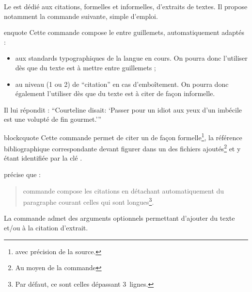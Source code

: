 \documentclass[english,nolocaltoc]{nwejmart}
\newtheorem[style=definition]{fait}
\newtheorem[title=expérience]{experience}
\newtheorem[title-plural=anneaux]{anneau}
\newtheorem[title=idéal,title-plural=idéaux]{ideal}
\begin{document}
Le  est dédié aux citations, formelles et informelles,
d'extraits de textes. Il propose notamment la commande 
suivante, simple d'emploi.

\begin{docCommand}{enquote}{}
  Cette commande compose le  entre guillemets, automatiquement
  adaptés :
  \begin{itemize}
  \item aux standards typographiques de la langue en cours. On pourra donc
    l'utiliser dès que du texte est à mettre entre guillemets ;
  \item au niveau (1 ou 2) de \enquote{citation} en cas d'emboîtement. On
    pourra donc également l'utiliser dès que du texte est à citer de façon
    informelle.
  \end{itemize}
\begin{bodycode}[listing and text,listing options={alsolanguage={[csquotes]TeX}}]
Il lui répondit : \enquote{Courteline disait: \enquote{Passer
    pour un idiot aux yeux d'un imbécile est une volupté de fin
    gourmet.}}
\end{bodycode}
\end{docCommand}

\begin{docCommand}{blockcquote}{}
  Cette commande permet de citer un  de façon
  formelle\footnote{\Ie*{} avec précision de la source.}, la référence
  bibliographique correspondante devant figurer dans un des fichiers 
  ajoutés\footnote{Au moyen de la commande } et
  y étant identifiée par la clé .

\renewcommand{\thempfootnote}{\arabic{mpfootnote}}
\begin{bodycode}[listing and text,listing options={alsolanguage={[biblatex]TeX},alsolanguage={[csquotes]TeX},deletekeywords={[3]footnote}}]
\citeauthor{Bitouze} précise que :
\blockcquote{Bitouze}{%
   commande compose les citations en détachant
  automatiquement du paragraphe courant celles qui sont
  longues\footnote{Par défaut, ce sont celles
    dépassant 3~lignes.}.%
}.
\end{bodycode}
\renewcommand{\thempfootnote}{\alph{mpfootnote}}
\end{docCommand}

La commande  admet des arguments optionnels permettant
d'ajouter du texte  et/ou  à la citation
d'extrait\autocite[Pour plus de détails, cf. par exemple][]{Bitouze}.
\end{document}
